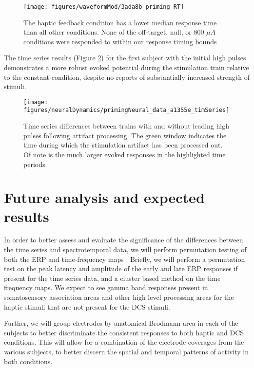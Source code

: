 \begin{figure}[ht]
	\centering
	\texttt{[image: figures/waveformMod/3ada8b\_priming\_RT]}
	\caption[Modified waveform - second subject]{The haptic feedback condition has a lower median response time than all other conditions. None of the off-target, null, or 800 $ \mu A$ conditions were responded to within our response timing bounds}
	\label{fig:primingResults2}
\end{figure}

The time series results (Figure \ref{fig:tsPriming}) for the first subject with the initial high pulses demonstrates a more robust evoked potential during the stimulation train relative to the constant condition, despite no reports of substantially increased strength of stimuli. 

\begin{figure}[ht]
	\centering
	\texttt{[image: figures/neuralDynamics/primingNeural\_data\_a1355e\_timSeries]}
	\caption[Time series differences between trains with and without leading high pulses following artifact processing. ]{Time series differences between trains with and without leading high pulses following artifact processing. The green window indicates the time during which the stimulation artifact has been processed out. Of note is the much larger evoked responses in the highlighted time periods.}
	\label{fig:tsPriming}
\end{figure}

\section{Future analysis and expected results}

In order to better assess and evaluate the significance of the differences between the time series and spectrotemporal data, we will perform permutation testing of both the ERP and time-frequency maps \cite{Maris2007,Maris2012}. Briefly, we will perform a permutation test on the peak latency and amplitude of the early and late ERP responses if present for the time series data, and a cluster based method on the time frequency maps. We expect to see gamma band responses present in somatosensory association areas and other high level processing areas for the haptic stimuli that are not present for the DCS stimuli. 

Further, we will group electrodes by anatomical Brodmann area in each of the subjects to better discriminate the consistent responses to both haptic and DCS conditions. This will allow for a combination of the electrode coverages from the various subjects, to better discern the spatial and temporal patterns of activity in both conditions. 

